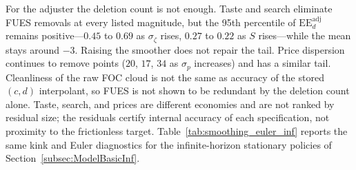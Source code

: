For the adjuster the deletion count is not enough. Taste and search eliminate FUES removals at every listed magnitude, but the 95th percentile of $\mathrm{EE}_d^{\mathrm{adj}}$ remains positive---$0.45$ to $0.69$ as $\sigma_\zeta$ rises, $0.27$ to $0.22$ as $S$ rises---while the mean stays around $-3$. Raising the smoother does not repair the tail. Price dispersion continues to remove points ($20$, $17$, $34$ as $\sigma_p$ increases) and has a similar tail. Cleanliness of the raw FOC cloud is not the same as accuracy of the stored $(c,d)$ interpolant, so FUES is not shown to be redundant by the deletion count alone. Taste, search, and prices are different economies and are not ranked by residual size; the residuals certify internal accuracy of each specification, not proximity to the frictionless target. Table~\ref{tab:smoothing_euler_inf} reports the same kink and Euler diagnostics for the infinite-horizon stationary policies of Section~\ref{subsec:ModelBasicInf}.

\begin{table}[htbp]
\centering
\caption{Period-$t$ kink counts and Euler residuals under the hard-max baseline and the same $\sigma_\zeta$, $S$, and $\sigma_p$ sweep as Figure~\ref{fig:smoothing_shifts_levels}. Residuals are mean and 95th percentile of~\eqref{eq:judd_ee} on an off-grid test mesh; constrained points excluded. The $\sigma_p$ adjuster kink count sums over price nodes.}
\label{tab:smoothing_euler}
\small

\end{table}

\begin{table}[htbp]
\centering
\caption{Infinite-horizon kink counts and Euler residuals. The taste, search-only, and price-only blocks vary one device with the other two shut off. The last two blocks vary $\sigma_p$ at $S=0.2$ and $S$ at $\sigma_p=0.1$, as in Table~\ref{tab:inf_ss}. Residuals are the mean and 95th percentile of~\eqref{eq:judd_ee} on an off-grid test mesh at the stationary policy; constrained points are excluded. The $\sigma_p$ adjuster kink count sums over price nodes.}
\label{tab:smoothing_euler_inf}
\small

\end{table}



